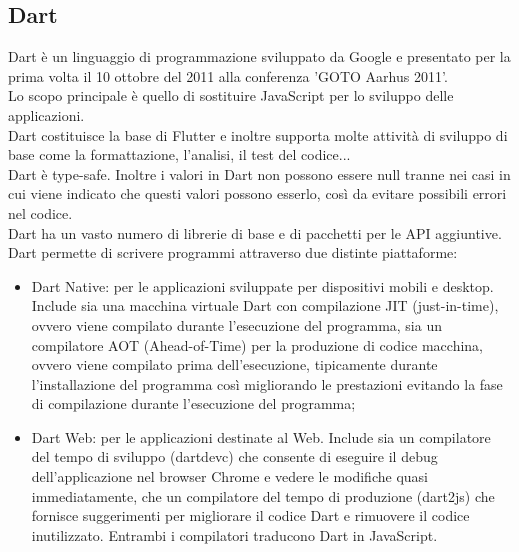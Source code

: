\subsection{Dart}
\label{sec:Dart}
Dart è un linguaggio di programmazione sviluppato da Google e presentato per la prima volta il 10 ottobre del 2011 alla conferenza 'GOTO Aarhus 2011'.\\
Lo scopo principale è quello di sostituire JavaScript per lo sviluppo delle applicazioni.\\
Dart costituisce la base di Flutter e inoltre supporta molte attività di sviluppo di base come la formattazione, l'analisi, il test del codice...\\
Dart è type-safe. Inoltre i valori in Dart non possono essere null tranne nei casi in cui viene indicato che questi valori possono esserlo, così da evitare possibili errori nel codice.\\
Dart ha un vasto numero di librerie di base e di pacchetti per le API aggiuntive.\\
Dart permette di scrivere programmi attraverso due distinte piattaforme:
\begin{itemize}
	\item Dart Native: per le applicazioni sviluppate per dispositivi mobili e desktop. Include sia una macchina virtuale Dart con compilazione JIT (just-in-time), ovvero viene compilato durante l'esecuzione del programma, sia un compilatore AOT (Ahead-of-Time) per la produzione di codice macchina, ovvero  viene compilato prima dell'esecuzione, tipicamente durante l'installazione del programma così migliorando le prestazioni evitando la fase di compilazione durante l'esecuzione del programma;  
	\item Dart Web: per le applicazioni destinate al Web. Include sia un compilatore del tempo di sviluppo (dartdevc) che consente di eseguire il debug dell'applicazione nel browser Chrome e vedere le modifiche quasi immediatamente, che un compilatore del tempo di produzione (dart2js) che fornisce suggerimenti per migliorare il codice Dart e rimuovere il codice inutilizzato. Entrambi i compilatori traducono Dart in JavaScript.\\
\end{itemize}


